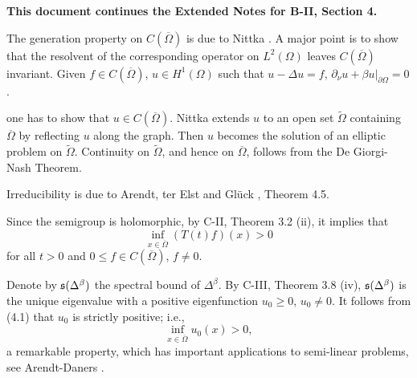 %
%
%
%
%

\bigskip
\textbf{This document continues the Extended Notes for B-II, Section 4.}
\bigskip

The generation property on $C(\overline{\Omega})$ is due to Nittka \cite{Ni11}. A major point is to show that the resolvent of the corresponding operator on $L^2(\Omega)$ leaves $C(\overline{\Omega})$ invariant. Given $f \in C(\overline{\Omega})$, $u \in H^1(\Omega)$ such that $u - \Delta u = f$, $\partial_\nu u + \beta u|_{\partial\Omega} = 0$.

one has to show that $u \in C(\overline{\Omega})$. Nittka extends $u$ to an open set $\widetilde{\Omega}$ containing $\overline{\Omega}$ by reflecting $u$ along the graph. Then $u$ becomes the solution of an elliptic problem on $\widetilde{\Omega}$. Continuity on $\widetilde{\Omega}$, and hence on $\overline{\Omega}$, follows from the De Giorgi-Nash Theorem.

Irreducibility is due to Arendt, ter Elst and Glück \cite{AEG20}, Theorem 4.5.

Since the semigroup is holomorphic, by C-II, Theorem 3.2 (ii), it implies that
\begin{equation} \tag{4.1}
\inf_{x \in \overline{\Omega}} (T(t)f)(x) > 0
\end{equation}
for all $t > 0$ and $0 \leq f \in C(\overline{\Omega})$, $f \neq 0$.

Denote by $\mathfrak{s}(\Delta^\beta)$ the spectral bound of $\Delta^\beta$. By C-III, Theorem 3.8 (iv), $\mathfrak{s}(\Delta^\beta)$ is the unique eigenvalue with a positive eigenfunction $u_0 \geq 0$, $u_0 \neq 0$. It follows from (4.1) that $u_0$ is strictly positive; i.e.,
\[\inf_{x \in \overline{\Omega}} u_0(x) > 0,\]
a remarkable property, which has important applications to semi-linear problems, see Arendt-Daners \cite{ArDa25}.

